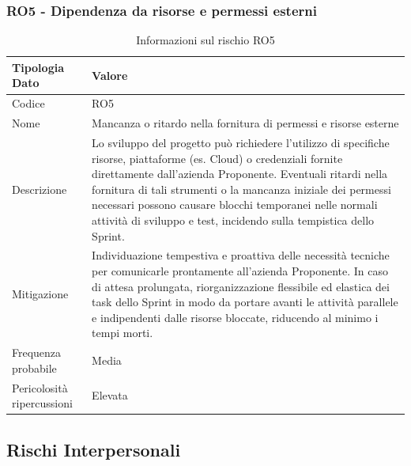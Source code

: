 \documentclass[a4paper,12pt]{article}
\begin{document}
\subsubsection{RO5 - Dipendenza da risorse e permessi esterni}
\begin{table}[H]
    \centering
    \renewcommand{\arraystretch}{1.4}
    \begin{tabularx}{\textwidth}{|L|Z|}
        \hline
        \textbf{Tipologia Dato} & \textbf{Valore} \\
        \hline
        Codice & RO5 \\
        \hline
        Nome & Mancanza o ritardo nella fornitura di permessi e risorse esterne \\
        \hline
        Descrizione & Lo sviluppo del progetto può richiedere l'utilizzo di specifiche risorse, piattaforme (es. Cloud) o credenziali fornite direttamente dall'azienda Proponente. Eventuali ritardi nella fornitura di tali strumenti o la mancanza iniziale dei permessi necessari possono causare blocchi temporanei nelle normali attività di sviluppo e test, incidendo sulla tempistica dello Sprint. \\
        \hline
        Mitigazione & Individuazione tempestiva e proattiva delle necessità tecniche per comunicarle prontamente all'azienda Proponente. In caso di attesa prolungata, riorganizzazione flessibile ed elastica dei task dello Sprint in modo da portare avanti le attività parallele e indipendenti dalle risorse bloccate, riducendo al minimo i tempi morti. \\
        \hline
        Frequenza probabile & Media \\
        \hline
        Pericolosità ripercussioni & Elevata \\
        \hline
    \end{tabularx}
    \caption{Informazioni sul rischio RO5}
    \label{tab:RO5}
\end{table}

\subsection{Rischi Interpersonali}\label{sec:rischi_interpersonali}
\end{document}
